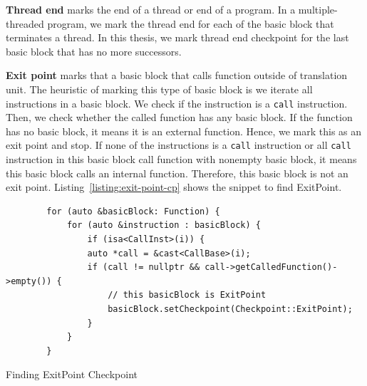 \vspace{0.5cm}
\noindent \textbf{Thread end} marks the end of a thread or end of a program. In
a multiple-threaded program, we mark the thread end for each of the basic block
that terminates a thread. In this thesis, we mark thread end checkpoint for the
last basic block that has no more successors.

\vspace{0.5cm}
\noindent \textbf{Exit point} marks that a basic block that calls function
outside of translation unit. The heuristic of marking this type of basic block
is we iterate all instructions in a basic block. We check if the instruction is
a \texttt{call} instruction. Then, we check whether the called function has any
basic block. If the function has no basic block, it means it is an external
function. Hence, we mark this as an exit point and stop. If none of the
instructions is a \texttt{call} instruction or all \texttt{call} instruction in
this basic block call function with nonempty basic block, it means this basic
block calls an internal function. Therefore, this basic block is not an exit
point. Listing~\ref{listing:exit-point-cp} shows the snippet to find ExitPoint.

\begin{listing}[ht!]
    \begin{verbatim}
        for (auto &basicBlock: Function) {
            for (auto &instruction : basicBlock) {
                if (isa<CallInst>(i)) {
                auto *call = &cast<CallBase>(i);
                if (call != nullptr && call->getCalledFunction()->empty()) {
                    // this basicBlock is ExitPoint
                    basicBlock.setCheckpoint(Checkpoint::ExitPoint);
                } 
            }
        } 
    \end{verbatim}
    \caption{Finding ExitPoint Checkpoint}    
    \label{listing:exit-point-cp}
\end{listing}

